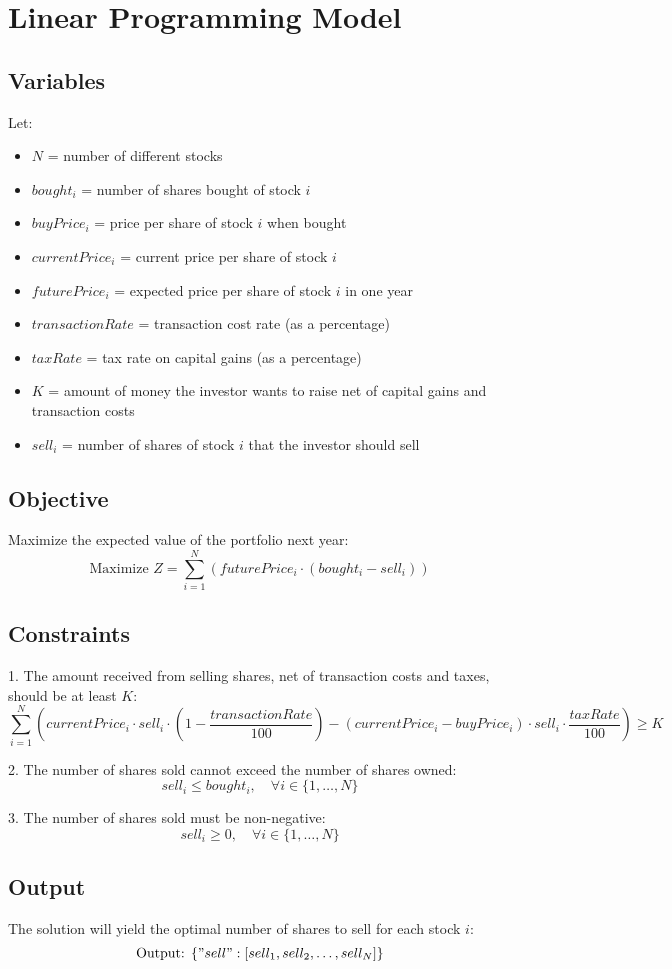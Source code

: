 \documentclass{article}
\begin{document}
\section*{Linear Programming Model}

\subsection*{Variables}
Let:
\begin{itemize}
    \item \( N \) = number of different stocks
    \item \( bought_i \) = number of shares bought of stock \( i \)
    \item \( buyPrice_i \) = price per share of stock \( i \) when bought
    \item \( currentPrice_i \) = current price per share of stock \( i \)
    \item \( futurePrice_i \) = expected price per share of stock \( i \) in one year
    \item \( transactionRate \) = transaction cost rate (as a percentage)
    \item \( taxRate \) = tax rate on capital gains (as a percentage)
    \item \( K \) = amount of money the investor wants to raise net of capital gains and transaction costs
    \item \( sell_i \) = number of shares of stock \( i \) that the investor should sell
\end{itemize}

\subsection*{Objective}
Maximize the expected value of the portfolio next year:
\[
\text{Maximize } Z = \sum_{i=1}^{N} \left( futurePrice_i \cdot (bought_i - sell_i) \right)
\]

\subsection*{Constraints}
1. The amount received from selling shares, net of transaction costs and taxes, should be at least \( K \):
\[
\sum_{i=1}^{N} \left( currentPrice_i \cdot sell_i \cdot (1 - \frac{transactionRate}{100}) - (currentPrice_i - buyPrice_i) \cdot sell_i \cdot \frac{taxRate}{100} \right) \geq K
\]

2. The number of shares sold cannot exceed the number of shares owned:
\[
sell_i \leq bought_i, \quad \forall i \in \{1, \ldots, N\}
\]

3. The number of shares sold must be non-negative:
\[
sell_i \geq 0, \quad \forall i \in \{1, \ldots, N\}
\]

\subsection*{Output}
The solution will yield the optimal number of shares to sell for each stock \( i \):
\[
\text{Output: } \{ "sell": [sell_1, sell_2, \ldots, sell_N] \}
\]
\end{document}
